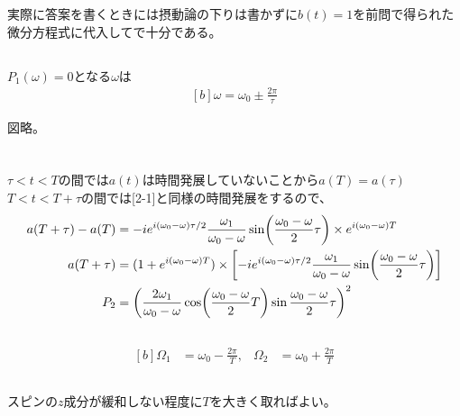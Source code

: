 \documentclass[../ap_2022.tex]{subfiles}
\begin{document}
実際に答案を書くときには摂動論の下りは書かずに\(b(t)=1\)を前問で得られた微分方程式に代入してで十分である。

\subsection{}
\(P_1(\omega)=0\)となる\(\omega\)は
\begin{equation}\begin{aligned}[b]
    \omega=\omega_0\pm\frac{2\pi}{\tau}
\end{aligned}\end{equation}

図略。

\section{}
\subsection{}
\(\tau<t<T\)の間では\(a(t)\)は時間発展していないことから\(a(T)=a(\tau)\)
\(T<t<T+\tau\)の間では[2-1]と同様の時間発展をするので、
\begin{equation}\begin{aligned}[b]
    a(T+\tau)-a(T)&=-ie^{i(\omega_0-\omega)\tau/2}\frac{\omega_1}{\omega_0-\omega}\sin(\frac{\omega_0-\omega}{2}\tau)\times e^{i(\omega_0-\omega)T}\\
    a(T+\tau) &= (1+e^{i(\omega_0-\omega)T})\times\qty[-ie^{i(\omega_0-\omega)\tau/2}\frac{\omega_1}{\omega_0-\omega}\sin(\frac{\omega_0-\omega}{2}\tau)]\\
    P_2 &= \qty(\frac{2\omega_1}{\omega_0-\omega}\cos(\frac{\omega_0-\omega}{2}T)\sin\frac{\omega_0-\omega}{2}\tau)^2
\end{aligned}\end{equation}

\subsection{}
\begin{equation}\begin{aligned}[b]
    \Omega_1 &=\omega_0-\frac{2\pi}{T},& \Omega_2 &= \omega_0+\frac{2\pi}{T}
\end{aligned}\end{equation}

\subsection{}
スピンの\(z\)成分が緩和しない程度に\(T\)を大きく取ればよい。
\end{document}
